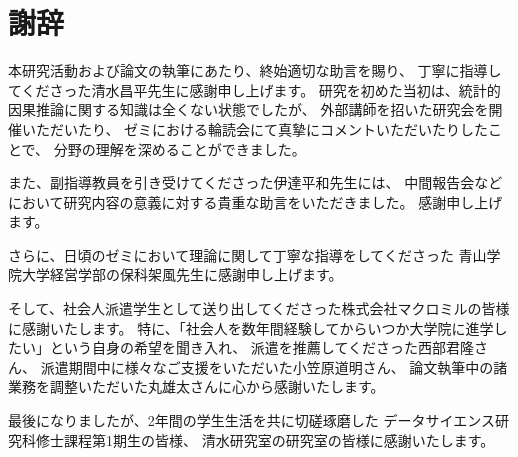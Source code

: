 %
\section*{謝辞}
%
本研究活動および論文の執筆にあたり、終始適切な助言を賜り、
丁寧に指導してくださった清水昌平先生に感謝申し上げます。
研究を初めた当初は、統計的因果推論に関する知識は全くない状態でしたが、
外部講師を招いた研究会を開催いただいたり、
ゼミにおける輪読会にて真摯にコメントいただいたりしたことで、
分野の理解を深めることができました。

また、副指導教員を引き受けてくださった伊達平和先生には、
中間報告会などにおいて研究内容の意義に対する貴重な助言をいただきました。
感謝申し上げます。

さらに、日頃のゼミにおいて理論に関して丁寧な指導をしてくださった
青山学院大学経営学部の保科架風先生に感謝申し上げます。

そして、社会人派遣学生として送り出してくださった株式会社マクロミルの皆様に感謝いたします。
特に、「社会人を数年間経験してからいつか大学院に進学したい」という自身の希望を聞き入れ、
派遣を推薦してくださった西部君隆さん、
派遣期間中に様々なご支援をいただいた小笠原道明さん、
論文執筆中の諸業務を調整いただいた丸雄太さんに心から感謝いたします。

最後になりましたが、2年間の学生生活を共に切磋琢磨した
データサイエンス研究科修士課程第1期生の皆様、
清水研究室の研究室の皆様に感謝いたします。
